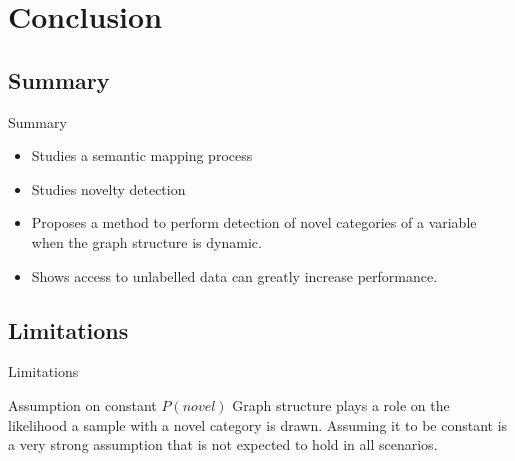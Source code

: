 \documentclass[compress]{beamer}
\begin{document}
\section{Conclusion}

\subsection{Summary}
\begin{frame}{Summary}
\begin{itemize}
\item Studies a semantic mapping process
\item Studies novelty detection
\item Proposes a method to perform detection of novel categories
      of a variable when the graph structure is dynamic.
\item Shows access to unlabelled data can greatly increase performance.
\end{itemize}
\end{frame}

\subsection{Limitations}
\begin{frame}{Limitations}
\begin{block}{Assumption on constant $P(novel)$}
Graph structure plays a role on the likelihood a sample with a novel
category is drawn. Assuming it to be constant is a very strong assumption
that is not expected to hold in all scenarios.
\end{block}
\end{frame}
\end{document}
